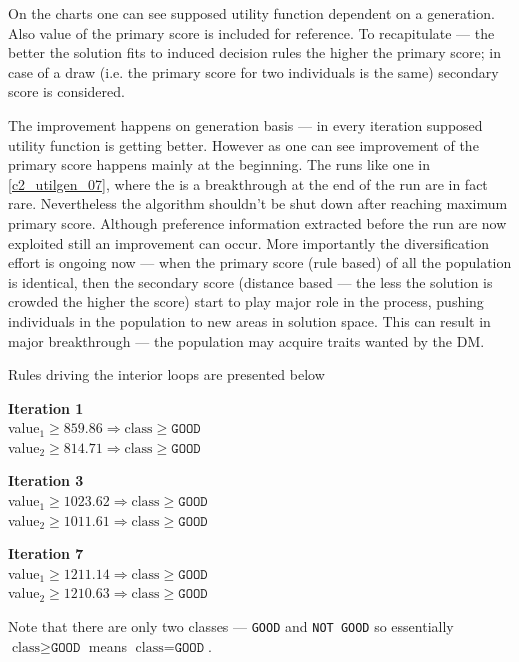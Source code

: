 On the charts one can see supposed utility function dependent on a
generation. Also value of the primary score is included for reference. To
recapitulate --- the better the solution fits to induced decision rules the
higher the primary score; in case of a draw (i.e. the primary score for two
individuals is the same) secondary score is considered.

The improvement happens on generation basis --- in every iteration supposed
utility function is getting better. However as one can see improvement of the
primary score happens mainly at the beginning. The runs like one in
\ref{c2_utilgen_07}, where the is a breakthrough at the end of the run are in
fact rare. Nevertheless the algorithm shouldn't be shut down after reaching
maximum primary score. Although preference information extracted before the
run are now exploited still an improvement can occur. More importantly the
diversification effort is ongoing now --- when the primary score (rule based)
of all the population is identical, then the secondary score (distance based
--- the less the solution is crowded the higher the score) start to play major
role in the process, pushing individuals in the population to new areas in
solution space. This can result in major breakthrough --- the population may
acquire traits wanted by the DM.

Rules driving the interior loops are presented below

\begin{description}
  \item{\textbf{Iteration 1}} \\
    value$_1 \ge 859.86 \Rightarrow \text{class} \ge \texttt{GOOD}$ \\
    value$_2 \ge 814.71 \Rightarrow \text{class} \ge \texttt{GOOD}$
  \item{\textbf{Iteration 3}} \\
    value$_1 \ge 1023.62 \Rightarrow \text{class} \ge \texttt{GOOD}$ \\
    value$_2 \ge 1011.61 \Rightarrow \text{class} \ge \texttt{GOOD}$
  \item{\textbf{Iteration 7}} \\
    value$_1 \ge 1211.14 \Rightarrow \text{class} \ge \texttt{GOOD}$ \\
    value$_2 \ge 1210.63 \Rightarrow \text{class} \ge \texttt{GOOD}$
\end{description}

Note that there are only two classes --- \texttt{GOOD} and \texttt{NOT GOOD}
so essentially $\text{class} \ge \texttt{GOOD}$ means $\text{class} =
\texttt{GOOD}$.

